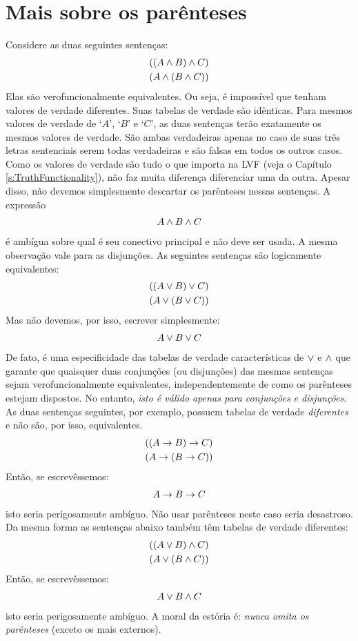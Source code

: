 \section{Mais sobre os parênteses}\label{s:MoreBracketingConventions}
Considere as duas seguintes sentenças:
	\begin{align*}
		((A \wedge B) \wedge C)\\
		(A \wedge (B \wedge C))
	\end{align*}
Elas são verofuncionalmente equivalentes.
Ou seja, é impossível que tenham valores de verdade diferentes.
Suas tabelas de verdade são idênticas.
Para mesmos valores de verdade de `$A$', `$B$' e `$C$', as duas sentenças terão exatamente os mesmos valores de verdade.
São ambas verdadeiras apenas no caso de suas três letras sentenciais serem todas verdadeiras e são falsas em todos os outros casos.
Como os valores de verdade são tudo o que importa na LVF (veja o Capítulo \ref{s:TruthFunctionality}), não faz muita diferença diferenciar uma da outra.
Apesar disso, não devemos simplesmente descartar os parênteses nessas sentenças.
A expressão
	\begin{align*}
		A \wedge B \wedge C
	\end{align*}
é ambígua sobre qual é seu conectivo principal e não deve ser usada.
A mesma observação vale para as disjunções.
As seguintes sentenças são logicamente equivalentes:
	\begin{align*}
		((A \vee B) \vee C)\\
		(A \vee (B \vee C))
	\end{align*}
Mas não devemos, por isso, escrever simplesmente:
	\begin{align*}
		A \vee B \vee C
	\end{align*}
De fato, é uma especificidade das tabelas de verdade características de $\vee$ e $\wedge$ que garante que quaisquer duas conjunções (ou disjunções) das mesmas sentenças sejam verofuncionalmente equivalentes, independentemente de como os parênteses estejam dispostos.
No entanto, \emph{isto é válido apenas para conjunções e disjunções}.
As duas sentenças seguintes, por exemplo, possuem tabelas de verdade \emph{diferentes} e não são, por isso, equivalentes.
	\begin{align*}
		((A \rightarrow B) \rightarrow C)\\
		(A \rightarrow (B \rightarrow C))
	\end{align*}
Então, se escrevêssemos:
	\begin{align*}
		A \rightarrow B \rightarrow C
	\end{align*}
isto seria perigosamente ambíguo.
Não usar parênteses neste caso seria desastroso.
Da mesma forma as sentenças abaixo também têm tabelas de verdade diferentes:
	\begin{align*}
		((A \vee B) \wedge C)\\
		(A \vee (B \wedge C))
	\end{align*}
Então, se escrevêssemos:
	\begin{align*}
		A \vee B \wedge C
	\end{align*}
isto seria perigosamente ambíguo.
A moral da estória é: \emph{nunca omita os parênteses} (exceto os mais externos).


